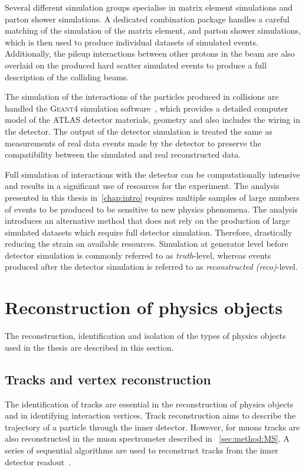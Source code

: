 Several different simulation groups specialise in matrix element simulations and parton shower simulations. A dedicated combination package handles a careful matching of the simulation of the matrix element, and parton shower simulations, which is then used to produce individual datasets of simulated events. Additionally, the pileup interactions between other protons in the beam are also overlaid on the produced hard scatter simulated events to produce a full description of the colliding beams. 

The simulation of the interactions of the particles produced in collisions are handled the \textsc{Geant4} simulation software~\cite{Geant1,Geant2,Geant3}, which provides a detailed computer model of the ATLAS detector materials, geometry and also includes the wiring in the detector. The output of the detector simulation is treated the same as measurements of real data events made by the detector to preserve the compatibility between the simulated and real reconstructed data. 

Full simulation of interactions with the detector can be computationally intensive and results in a significant use of resources for the experiment. The analysis presented in this thesis in~\cref{chap:intro} requires multiple samples of large numbers of events to be produced to be sensitive to new physics phenomena. The analysis introduces an alternative method that does not rely on the production of large simulated datasets which require full detector simulation. Therefore, drastically reducing the strain on available resources. Simulation at generator level before detector simulation is commonly referred to as \emph{truth}-level, whereas events produced after the detector simulation is referred to as \emph{reconstructed (reco)}-level.

\section{Reconstruction of physics objects}\label{sec:reconstruction}
The reconstruction, identification and isolation of the types of physics objects used in the thesis are described in this section. 

\subsection{Tracks and vertex reconstruction}\label{sec:reconstruction:tracks}
The identification of tracks are essential in the reconstruction of physics objects and in identifying interaction vertices. Track reconstruction aims to describe the trajectory of a particle through the inner detector. However, for muons tracks are also reconstructed in the muon spectrometer described in ~\cref{sec:method:MS}. A series of sequential algorithms are used to reconstruct tracks from the inner detector readout~\cite{ATLAS:tracking}. 

